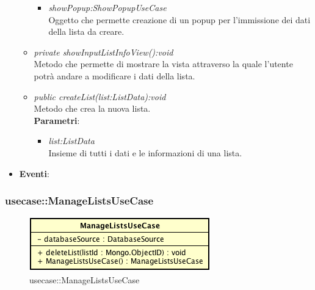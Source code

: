 \begin{itemize}
\begin{itemize}
\begin{itemize}
		\item \textit{showPopup:ShowPopupUseCase}\\
			Oggetto che permette creazione di un popup per l'immissione dei dati della lista da creare.
		\end{itemize} 
	\item \textit{private showInputListInfoView():void}\\
	 Metodo che permette di mostrare la vista attraverso la quale l'utente potrà andare a modificare i dati della lista.
	\item \textit{public createList(list:ListData):void}\\
	Metodo che crea la nuova lista.
			\\ \textbf{Parametri}: \begin{itemize}
			\item \textit{list:ListData}\\
			Insieme di tutti i dati e le informazioni di una lista.
			\end{itemize} 
	\end{itemize}
\item \textbf{Eventi}:
\end{itemize}

\subsubsection{usecase::ManageListsUseCase}

\label{usecase::ManageListsUseCase}
\begin{figure}[H]
	\centering
	\includegraphics[scale=0.5]{Sezioni/SottosezioniST/img/app/ManageListsUseCase.png}
	\caption{usecase::ManageListsUseCase}
\end{figure}

